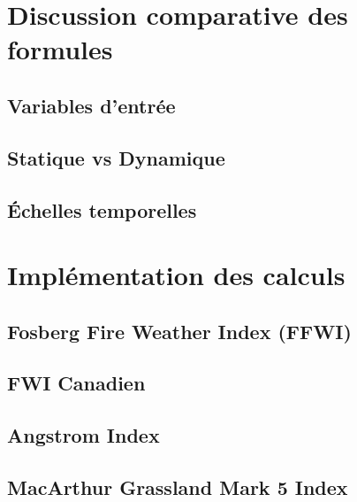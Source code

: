 \documentclass[
]{article}
\begin{document}
\hypertarget{discussion-comparative-des-formules}{%
\section{Discussion comparative des
formules}\label{discussion-comparative-des-formules}}

\hypertarget{variables-dentruxe9e}{%
\subsection{Variables d'entrée}\label{variables-dentruxe9e}}

\hypertarget{statique-vs-dynamique}{%
\subsection{Statique vs Dynamique}\label{statique-vs-dynamique}}

\hypertarget{uxe9chelles-temporelles}{%
\subsection{Échelles temporelles}\label{uxe9chelles-temporelles}}

\hypertarget{impluxe9mentation-des-calculs}{%
\section{Implémentation des
calculs}\label{impluxe9mentation-des-calculs}}

\hypertarget{fosberg-fire-weather-index-ffwi-1}{%
\subsection{Fosberg Fire Weather Index
(FFWI)}\label{fosberg-fire-weather-index-ffwi-1}}

\hypertarget{fwi-canadien-1}{%
\subsection{FWI Canadien}\label{fwi-canadien-1}}

\hypertarget{angstrom-index-1}{%
\subsection{Angstrom Index}\label{angstrom-index-1}}

\hypertarget{macarthur-grassland-mark-5-index-1}{%
\subsection{MacArthur Grassland Mark 5
Index}\label{macarthur-grassland-mark-5-index-1}}
\end{document}
